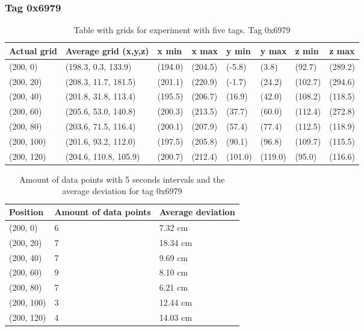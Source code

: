 \subsubsection{Tag 0x6979}
\begin{table}[H]
    \centering
    \begin{tabular}{|l|l|l|l|l|l|l|l|}
        \hline
        Actual grid & Average grid (x,y,z)  & x min   & x max   & y min   & y max   & z min   & z max   \\ \hline
        (200, 0)    & (198.3, 0.3, 133.9)   & (194.0) & (204.5) & (-5.8)  & (3.8)   & (92.7)  & (289.2) \\ \hline
        (200, 20)   & (208.3, 11.7, 181.5)  & (201.1) & (220.9) & (-1.7)  & (24.2)  & (102.7) & (294.6) \\ \hline
        (200, 40)   & (201.8, 31.8, 113.4)  & (195.5) & (206.7) & (16.9)  & (42.0)  & (108.2) & (118.5) \\ \hline
        (200, 60)   & (205.6, 53.0, 140.8)  & (200.3) & (213.5) & (37.7)  & (60.0)  & (112.4) & (272.8) \\ \hline
        (200, 80)   & (203.6, 71.5, 116.4)  & (200.1) & (207.9) & (57.4)  & (77.4)  & (112.5) & (118.9) \\ \hline
        (200, 100)  & (201.6, 93.2, 112.0)  & (197.5) & (205.8) & (90.1)  & (96.8)  & (109.7) & (115.5) \\ \hline
        (200, 120)  & (204.6, 110.8, 105.9) & (200.7) & (212.4) & (101.0) & (119.0) & (95.0)  & (116.6) \\ \hline
    \end{tabular}
    \caption{Table with grids for experiment with five tags. Tag 0x6979}
\end{table}

\begin{table}[H]
    \centering
    \begin{tabular}{|l|l|l|}
        \hline
        Position   & Amount of data points & Average deviation \\ \hline
        (200, 0)   & 6                     & 7.32 cm           \\ \hline
        (200, 20)  & 7                     & 18.34 cm          \\ \hline
        (200, 40)  & 7                     & 9.69 cm           \\ \hline
        (200, 60)  & 9                     & 8.10 cm           \\ \hline
        (200, 80)  & 7                     & 6.21 cm           \\ \hline
        (200, 100) & 3                     & 12.44 cm          \\ \hline
        (200, 120) & 4                     & 14.03 cm          \\ \hline
    \end{tabular}
    \caption{Amount of data points with 5 seconds intervals and the average deviation for tag 0x6979}
\end{table}

